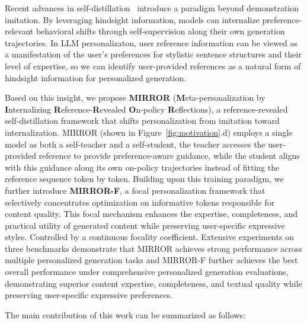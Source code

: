 \documentclass{article} %
\begin{document}
Recent advances in self-distillation~\citep{OPSD,SDFT} introduce a paradigm beyond demonstration imitation. By leveraging hindsight information, models can internalize preference-relevant behavioral shifts through self-supervision along their own generation trajectories. In LLM personalizaton, user reference information can be viewed as a manifestation of the user's preferences for stylistic sentence structures and their level of expertise, so we can identify user-provided references as a natural form of hindsight information for personalized generation.

Based on this insight, we propose \textbf{MIRROR} (\textbf{M}eta-personalization by \textbf{I}nternalizing \textbf{R}eference-\textbf{R}evealed \textbf{O}n-policy \textbf{R}eflections), a reference-revealed self-distillation framework that shifts personalization from imitation toward internalization. MIRROR (shown in Figure~\ref{fig:motivation}.d) employs a single model as both a self-teacher and a self-student, the teacher accesses the user-provided reference to provide preference-aware guidance, while the student aligns with this guidance along its own on-policy trajectories instead of fitting the reference sequence token by token. Building upon this training paradigm, we further introduce \textbf{MIRROR-F}, a focal personalization framework that selectively concentrates optimization on informative tokens responsible for content quality. This focal mechanism enhances the expertise, completeness, and practical utility of generated content while preserving user-specific expressive styles. Controlled by a continuous focality coefficient. Extensive experiments on three benchmarks demonstrate that MIRROR achieves strong performance across multiple personalized generation tasks and MIRROR-F further achieves the best overall performance under comprehensive personalized generation evaluations, demonstrating superior content expertise, completeness, and textual quality while preserving user-specific expressive preferences.

The main contribution of this work can be summarized as follows:
\end{document}
